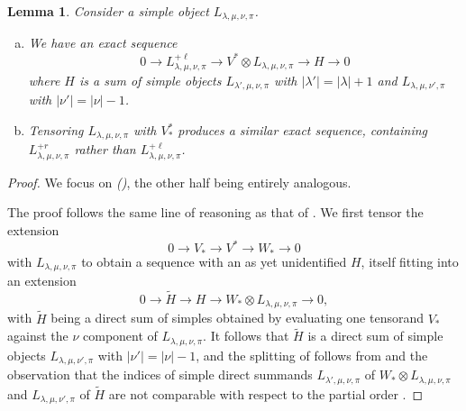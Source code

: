 \documentclass[11pt]{article}
\theoremstyle{plain}
\newtheorem{lemma}{Lemma}[section]
\theoremstyle{nonumberplain}
\theoremstyle{plain}
\numberwithin{equation}{section}
\theoremstyle{nonumberplain}
\newtheorem{proof}{Proof}
\newcommand\1{{\bf 1}}
\begin{document}
\begin{lemma}\label{le.exact}
  Consider a simple object $L_{\lambda,\mu,\nu,\pi}${.}
  \begin{enumerate}[(a)]
  \item\label{item:14} We have an exact sequence
    \begin{equation}\label{eq:18}
      0\to L^{+\ell}_{\lambda,\mu,\nu,\pi}\to V^*\otimes L_{\lambda,\mu,\nu,\pi} \to H \to 0
    \end{equation}
    where $H$ is a sum of simple objects $L_{\lambda',\mu,\nu,\pi}$ with $|\lambda'|=|\lambda|+1$ and $L_{\lambda,\mu,\nu',\pi}$ with $|\nu'|=|\nu|-1$. 
  \item\label{item:15} Tensoring $L_{\lambda,\mu,\nu,\pi}$ with $V_*^*$ produces a similar exact sequence, containing $L_{\lambda,\mu,\nu,\pi}^{+r}$ rather than $L_{\lambda,\mu,\nu,\pi}^{+\ell}$. 
  \end{enumerate}
\end{lemma}
\begin{proof}
  We focus on \emph{()}, the other half being entirely analogous.

  The proof follows the same line of reasoning as that of \cite[Lemma 3.13]{us0}. We first tensor the extension
  \begin{equation*}
    0\to V_*\to V^*\to W_*\to 0
  \end{equation*}
  with $L_{\lambda,\mu,\nu,\pi}$ to obtain a sequence  with an as yet unidentified $H$, itself fitting into an extension
  \begin{equation}\label{eq:19}
    0\to \widetilde{H} \to H \to W_*\otimes L_{\lambda,\mu,\nu,\pi}\to 0,
  \end{equation}
  with $\widetilde{H}$ being a direct sum of simples obtained by evaluating one tensorand $V_*$ against the $\nu$ component of $L_{\lambda,\mu,\nu,\pi}$. It follows that $\widetilde{H}$ is a direct sum of simple objects $L_{\lambda,\mu,\nu',\pi}$ with $|\nu'|=|\nu|-1$, and the splitting of  follows from  and the observation that the indices of simple direct summands
   $L_{\lambda',\mu,\nu,\pi}$
    of $W_*\otimes L_{\lambda,\mu,\nu,\pi}$ and
    $L_{\lambda,\mu,\nu',\pi}$  of $\widetilde{H}$  are not comparable with respect to the partial order  .
\end{proof}
\end{document}
